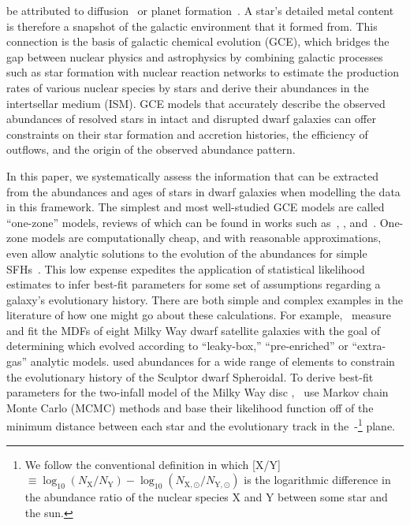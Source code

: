 be attributed to diffusion~\citep{BertelliMotta2018, Liu2019, Souto2019} or
planet formation~\citep{Melendez2009, Liu2016a, Spina2018}.
A star's detailed metal content is therefore a snapshot of the galactic
environment that it formed from.
This connection is the basis of galactic chemical evolution (GCE), which
bridges the gap between nuclear physics and astrophysics by combining galactic
processes such as star formation with nuclear reaction networks to estimate the
production rates of various nuclear species by stars and derive their
abundances in the intertsellar medium (ISM).
GCE models that accurately describe the observed abundances of resolved stars
in intact and disrupted dwarf galaxies can offer constraints on their star
formation and accretion histories, the efficiency of outflows, and the origin
of the observed abundance pattern.
\par
In this paper, we systematically assess the information that can be extracted
from the abundances and ages of stars in dwarf galaxies when modelling the
data in this framework.
The simplest and most well-studied GCE models are called ``one-zone'' models,
reviews of which can be found in works such as~\citet{Tinsley1980},
\citet{Pagel2009}, and~\citet{Matteucci2012, Matteucci2021}.
One-zone models are computationally cheap, and with reasonable approximations,
even allow analytic solutions to the evolution of the abundances for simple
SFHs~\citep*[e.g.,][]{Weinberg2017b}.
This low expense expedites the application of statistical likelihood estimates
to infer best-fit parameters for some set of assumptions regarding a galaxy's
evolutionary history.
There are both simple and complex examples in the literature of how one might
go about these calculations.
For example,~\citet{Kirby2011} measure and fit the MDFs of eight Milky Way
dwarf satellite galaxies with the goal of determining which evolved according
to ``leaky-box,'' ``pre-enriched'' or ``extra-gas'' analytic models.
\citet{delosReyes2022} used abundances for a wide range of elements to
constrain the evolutionary history of the Sculptor dwarf Spheroidal.
To derive best-fit parameters for the two-infall model of the Milky Way disc
\citep[e.g.,][]{Chiappini1997},~\citet{Spitoni2020, Spitoni2021} use Markov
chain Monte Carlo (MCMC) methods and base their likelihood function off of the
minimum distance between each star and the evolutionary track in
the~\afe-\feh\footnote{
	We follow the conventional definition in which
	[X/Y]~$\equiv \log_{10}(N_\text{X} / N_\text{Y}) -
	\log_{10}(N_{\text{X},\odot} / N_{\text{Y},\odot})$
	is the logarithmic difference in the abundance ratio of the nuclear species
	X and Y between some star and the sun.
} plane.
